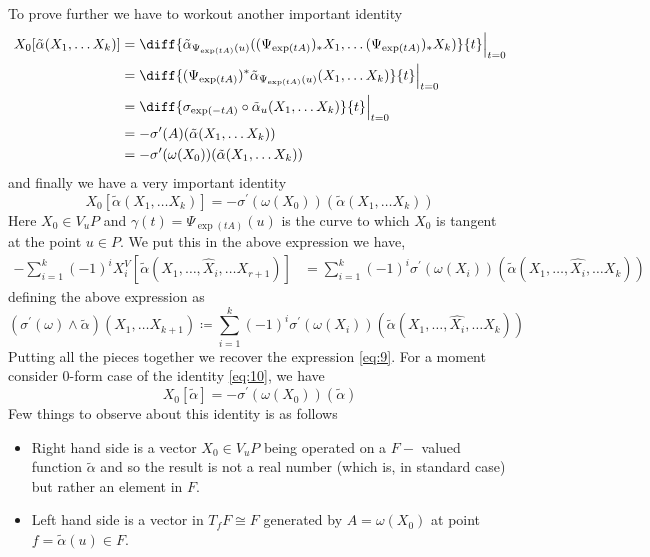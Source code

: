 \documentclass[12pt]{article}
\begin{document}
To prove further we have to workout another important identity
\begin{align*}
    X_{0}[\tilde{\alpha}(X_{1}, \dots X_{k})] &= \diff{\tilde{\alpha}_{\Psi_{\exp(tA)}(u)}((\Psi_{\exp(tA)})_{\ast}X_{1}, \dots (\Psi_{\exp(tA)})_{\ast}X_{k})}{t}\Bigr|_{t=0} \\
                                              &= \diff{(\Psi_{\exp(tA)})^{\ast}\tilde{\alpha}_{\Psi_{\exp(tA)}(u)}(X_{1}, \dots X_{k})}{t}\Bigr|_{t=0} \\
                                              &= \diff{\sigma_{\exp(-tA)}\circ\tilde{\alpha}_{u}(X_{1}, \dots X_{k})}{t}\Bigr|_{t=0} \\
                                              &= -\sigma^{\prime}(A)(\tilde{\alpha}(X_{1}, \dots X_{k})) \\
                                              &= -\sigma^{\prime}(\omega(X_{0}))(\tilde{\alpha}(X_{1}, \dots X_{k}))
\end{align*} and finally we have a very important identity
\begin{equation*}\label{eq:10}
    X_{0}[\tilde{\alpha}(X_{1}, \dots X_{k})] = -\sigma^{\prime}(\omega(X_{0}))(\tilde{\alpha}(X_{1}, \dots X_{k}))
\end{equation*}
Here $X_{0}\in V_{u}P$ and $\gamma(t) = \Psi_{\exp(tA)}(u)$ is the curve to which $X_{0}$ is tangent at the point $u\in P$. We put this in the above expression we have,
\begin{align*}
   -\sum^{k}_{i=1}(-1)^{i}X^{V}_{i}[\tilde{\alpha}(X_{1}, \dots, \hat{X}_{i}, \dots X_{r+1})] &= \sum^{k}_{i=1}(-1)^{i}\sigma^{\prime}(\omega(X_{i}))(\tilde{\alpha}(X_{1}, \dots, \hat{X_{i}}, \dots X_{k}))
\end{align*} defining the above expression as
\begin{equation*}
    (\sigma^{\prime}(\omega)\wedge\tilde{\alpha})(X_{1}, \dots X_{k+1})\coloneqq \sum^{k}_{i=1}(-1)^{i}\sigma^{\prime}(\omega(X_{i}))(\tilde{\alpha}(X_{1}, \dots, \hat{X_{i}}, \dots X_{k}))
\end{equation*} Putting all the pieces together we recover the expression \ref{eq:9}. For a moment consider 0-form case of the identity \ref{eq:10}, we have
\begin{equation}\label{eq:11}
    X_{0}[\tilde{\alpha}] = -\sigma^{\prime}(\omega(X_{0}))(\tilde{\alpha})
\end{equation}
Few things to observe about this identity is as follows
\begin{itemize}
    \item Right hand side is a vector $X_{0}\in V_{u}P$ being operated on a $F-$ valued function $\tilde{\alpha}$ and so the result is not a real number (which is, in standard case) but rather an element in $F$.
    \item Left hand side is a vector in $T_{f}F\cong F$ generated by $A = \omega(X_{0})$ at point $f = \tilde{\alpha}(u)\in F$.
\end{itemize}
\end{document}
